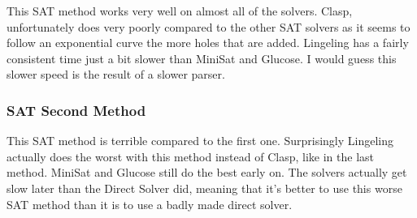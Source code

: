 \documentclass[11pt]{article} %
\begin{document}
This SAT method works very well on almost all of the solvers. Clasp, unfortunately does very poorly compared to the other SAT solvers as it seems to follow an exponential curve the more holes that are added. Lingeling has a fairly consistent time just a bit slower than MiniSat and Glucose. I would guess this slower speed is the result of a slower parser.

\subsubsection{SAT Second Method}

This SAT method is terrible compared to the first one. Surprisingly Lingeling actually does the worst with this method instead of Clasp, like in the last method. MiniSat and Glucose still do the best early on. The solvers actually get slow later than the Direct Solver did, meaning that it's better to use this worse SAT method than it is to use a badly made direct solver.
\end{document}
